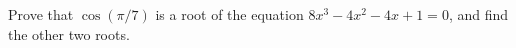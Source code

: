 Prove that $\cos(\pi/7)$ is a root of the equation $8x^3 - 4x^2 - 4x + 1 = 0$,
and find the other two roots.
